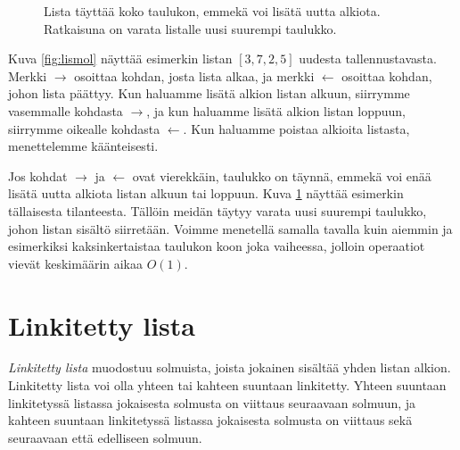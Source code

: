 \begin{figure}
\center
{}
\caption{Lista täyttää koko taulukon, emmekä voi lisätä uutta alkiota.
Ratkaisuna on varata listalle uusi suurempi taulukko.}
\label{fig:lismol2}
\end{figure}

Kuva \ref{fig:lismol} näyttää esimerkin listan $[3,7,2,5]$
uudesta tallennustavasta.
Merkki $\rightarrow$ osoittaa kohdan, josta lista alkaa,
ja merkki $\leftarrow$ osoittaa kohdan, johon lista päättyy.
Kun haluamme lisätä alkion listan alkuun,
siirrymme vasemmalle kohdasta $\rightarrow$,
ja kun haluamme lisätä alkion listan loppuun,
siirrymme oikealle kohdasta $\leftarrow$.
Kun haluamme poistaa alkioita listasta,
menettelemme käänteisesti.

Jos kohdat $\rightarrow$ ja $\leftarrow$ ovat vierekkäin,
taulukko on täynnä, emmekä voi enää lisätä uutta alkiota
listan alkuun tai loppuun.
Kuva \ref{fig:lismol2} näyttää esimerkin tällaisesta tilanteesta.
Tällöin meidän täytyy varata uusi suurempi taulukko,
johon listan sisältö siirretään.
Voimme menetellä samalla tavalla kuin aiemmin ja
esimerkiksi kaksinkertaistaa taulukon koon joka vaiheessa,
jolloin operaatiot vievät keskimäärin aikaa $O(1)$.

\section{Linkitetty lista}


\emph{Linkitetty lista} muodostuu solmuista, joista jokainen sisältää
yhden listan alkion.
Linkitetty lista voi olla yhteen tai kahteen suuntaan linkitetty.
Yhteen suuntaan linkitetyssä listassa jokaisesta solmusta
on viittaus seuraavaan solmuun, ja kahteen suuntaan linkitetyssä
listassa jokaisesta solmusta on viittaus sekä seuraavaan että edelliseen solmuun.

